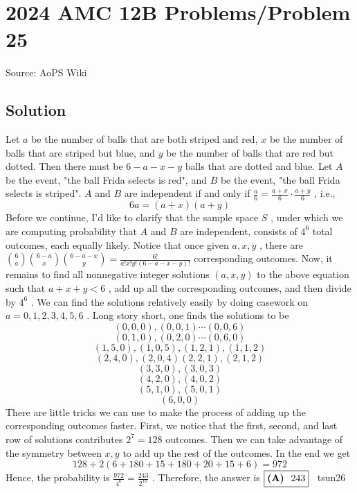 \documentclass[12pt]{article}
\begin{document}
\section*{{2024 AMC 12B Problems/Problem 25}}
Source: AoPS Wiki

\subsection*{Solution}
Let $a$ be the number of balls that are both striped and red, $x$ be the number of balls that are striped but blue, and $y$ be the number of balls that are red but dotted. Then there must be $6-a-x-y$ balls that are dotted and blue. Let $A$ be the event, "the ball Frida selects is red", and $B$ be the event, "the ball Frida selects is striped". $A$ and $B$ are independent if and only if $\frac{a}{6}=\frac{a+x}{6}\cdot\frac{a+y}{6}$ , i.e., \[6a=(a+x)(a+y)\] Before we continue, I'd like to clarify that the sample space $S$ , under which we are computing probability that $A$ and $B$ are independent, consists of $4^6$ total outcomes, each equally likely. Notice that once given $a, x, y$ , there are ${6\choose a}{6-a \choose x}{6-a-x \choose y}=\frac{6!}{a!x!y!(6-a-x-y)!}$ corresponding outcomes. Now, it remains to find all nonnegative integer solutions $(a, x, y)$ to the above equation such that $a+x+y<6$ , add up all the corresponding outcomes, and then divide by $4^6$ . We can find the solutions relatively easily by doing casework on $a=0, 1, 2, 3, 4, 5, 6$ . Long story short, one finds the solutions to be \[(0, 0, 0), (0, 0, 1)\cdots (0, 0, 6)\] \[(0, 1, 0), (0, 2, 0)\cdots (0, 6, 0)\] \[(1, 5, 0), (1, 0, 5), (1, 2, 1), (1, 1, 2)\] \[(2, 4, 0), (2, 0, 4) (2, 2, 1), (2, 1, 2)\] \[(3, 3, 0), (3, 0, 3)\] \[(4, 2, 0), (4, 0, 2)\] \[(5, 1, 0), (5, 0, 1)\] \[(6, 0, 0)\] There are little tricks we can use to make the process of adding up the corresponding outcomes faster. First, we notice that the first, second, and last row of solutions contributes $2^7=128$ outcomes. Then we can take advantage of the symmetry between $x, y$ to add up the rest of the outcomes. In the end we get \[128+2(6+180+15+180+20+15+6)=972\] Hence, the probability is $\frac{972}{4^6}=\frac{243}{2^{10}}$ . Therefore, the answer is $\fbox{\textbf{(A) } 243}$ ~tsun26
\end{document}
